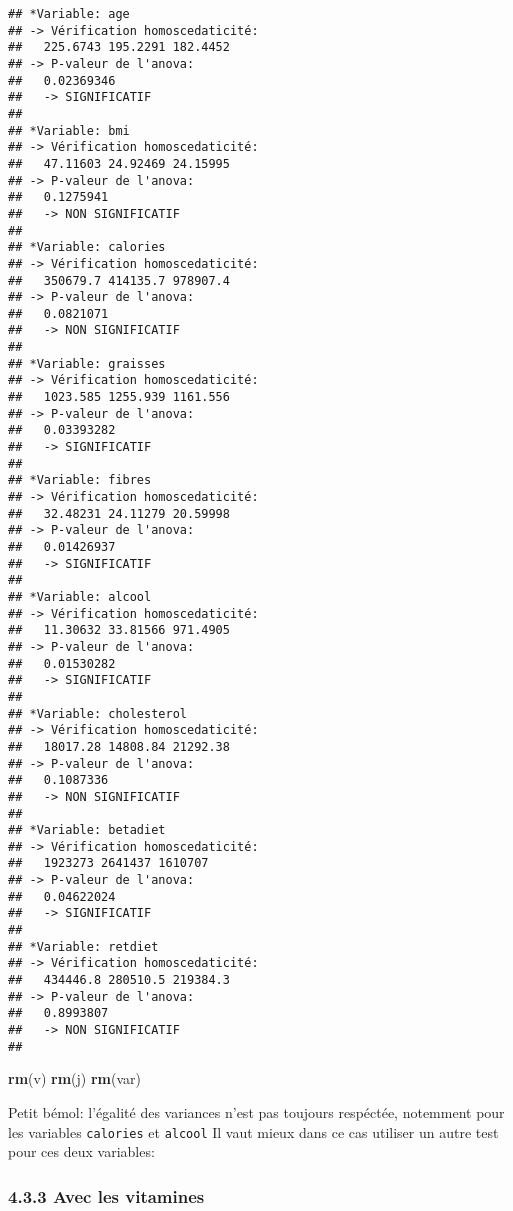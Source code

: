 \documentclass[]{article}
\newenvironment{Shaded}{\begin{snugshade}}{\end{snugshade}}
\newcommand{\KeywordTok}[1]{\textcolor[rgb]{0.13,0.29,0.53}{\textbf{#1}}}
\newcommand{\NormalTok}[1]{#1}
\begin{document}
\begin{verbatim}
## *Variable: age 
## -> Vérification homoscedaticité: 
##   225.6743 195.2291 182.4452 
## -> P-valeur de l'anova: 
##   0.02369346 
##   -> SIGNIFICATIF 
##  
## *Variable: bmi 
## -> Vérification homoscedaticité: 
##   47.11603 24.92469 24.15995 
## -> P-valeur de l'anova: 
##   0.1275941 
##   -> NON SIGNIFICATIF 
##  
## *Variable: calories 
## -> Vérification homoscedaticité: 
##   350679.7 414135.7 978907.4 
## -> P-valeur de l'anova: 
##   0.0821071 
##   -> NON SIGNIFICATIF 
##  
## *Variable: graisses 
## -> Vérification homoscedaticité: 
##   1023.585 1255.939 1161.556 
## -> P-valeur de l'anova: 
##   0.03393282 
##   -> SIGNIFICATIF 
##  
## *Variable: fibres 
## -> Vérification homoscedaticité: 
##   32.48231 24.11279 20.59998 
## -> P-valeur de l'anova: 
##   0.01426937 
##   -> SIGNIFICATIF 
##  
## *Variable: alcool 
## -> Vérification homoscedaticité: 
##   11.30632 33.81566 971.4905 
## -> P-valeur de l'anova: 
##   0.01530282 
##   -> SIGNIFICATIF 
##  
## *Variable: cholesterol 
## -> Vérification homoscedaticité: 
##   18017.28 14808.84 21292.38 
## -> P-valeur de l'anova: 
##   0.1087336 
##   -> NON SIGNIFICATIF 
##  
## *Variable: betadiet 
## -> Vérification homoscedaticité: 
##   1923273 2641437 1610707 
## -> P-valeur de l'anova: 
##   0.04622024 
##   -> SIGNIFICATIF 
##  
## *Variable: retdiet 
## -> Vérification homoscedaticité: 
##   434446.8 280510.5 219384.3 
## -> P-valeur de l'anova: 
##   0.8993807 
##   -> NON SIGNIFICATIF 
## 
\end{verbatim}

\begin{Shaded}
\begin{Highlighting}[]
\KeywordTok{rm}\NormalTok{(v)}
\KeywordTok{rm}\NormalTok{(j)}
\KeywordTok{rm}\NormalTok{(var)}
\end{Highlighting}
\end{Shaded}

Petit bémol: l'égalité des variances n'est pas toujours respéctée,
notemment pour les variables \texttt{calories} et \texttt{alcool} Il
vaut mieux dans ce cas utiliser un autre test pour ces deux variables:

\subsubsection{4.3.3 Avec les vitamines}\label{avec-les-vitamines}
\end{document}
